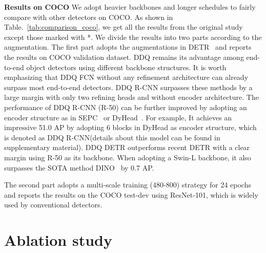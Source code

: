 \documentclass[10pt,twocolumn,letterpaper]{article}
\begin{document}
\noindent \textbf{Results on COCO} We adopt heavier backbones and longer schedules to fairly compare with other detectors on COCO. As shown in Table.~\ref{tab:comparison_coco}, we get all the results from the original study except those marked with *. We divide the results into two parts according to the augmentation. The first part adopts the augmentations in DETR~\cite{carion2020end} and reports the results on COCO validation dataset. DDQ remains its advantage among end-to-end object detectors using different backbone structures. It is worth emphasizing that DDQ FCN without any refinement architecture can already surpass most end-to-end detectors. DDQ R-CNN surpasses these methods by a large margin with only two refining heads and without encoder architecture. The performance of DDQ R-CNN (R-50) can be further improved by adopting an encoder structure as in SEPC~\cite{Wang_2020_CVPR} or DyHead~\cite{dai2021dynamichead}. For example, It achieves an impressive 51.0 AP by adopting 6 blocks in DyHead as encoder structure, which is denoted as DDQ R-CNN(details about this model can be found in supplementary material). DDQ DETR outperforms recent DETR with a clear margin using R-50 as its backbone. When adopting a Swin-L backbone, it also surpasses the SOTA method DINO~\cite{zhang2022dino} by 0.7 AP.

The second part adopts a multi-scale training (480-800) strategy for 24 epochs and reports the results on the COCO test-dev using ResNet-101, which is widely used by conventional detectors.

\section{Ablation study}
\end{document}
